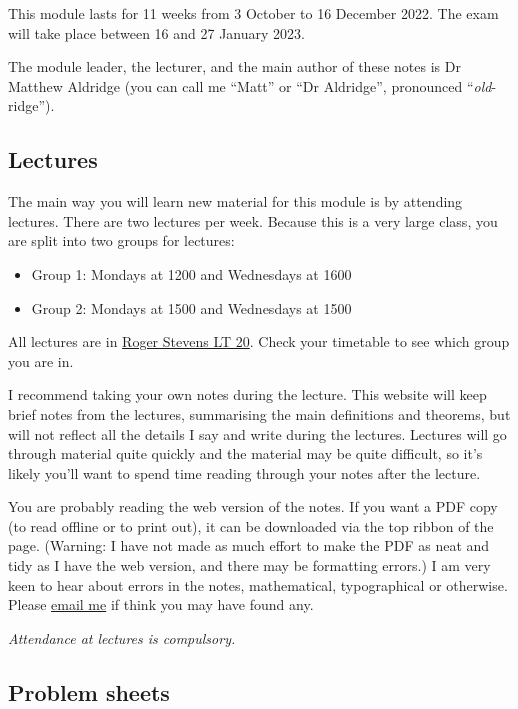 \documentclass[
  letterpaper,
]{report}
\providecommand{\tightlist}{%
  \setlength{\itemsep}{0pt}\setlength{\parskip}{0pt}}\usepackage{longtable,booktabs,array}
\theoremstyle{definition}
\theoremstyle{definition}
\theoremstyle{remark}
\begin{document}
This module lasts for 11 weeks from 3 October to 16 December 2022. The
exam will take place between 16 and 27 January 2023.

The module leader, the lecturer, and the main author of these notes is
Dr Matthew Aldridge (you can call me ``Matt'' or ``Dr Aldridge'',
pronounced ``\emph{old}-ridge'').

\hypertarget{lectures}{%
\subsection*{Lectures}\label{lectures}}

The main way you will learn new material for this module is by attending
lectures. There are two lectures per week. Because this is a very large
class, you are split into two groups for lectures:

\begin{itemize}
\tightlist
\item
  Group 1: Mondays at 1200 and Wednesdays at 1600
\item
  Group 2: Mondays at 1500 and Wednesdays at 1500
\end{itemize}

All lectures are in
\href{https://students.leeds.ac.uk/rooms?type=room\&id=100044}{Roger
Stevens LT 20}. Check your timetable to see which group you are in.

I recommend taking your own notes during the lecture. This website will
keep brief notes from the lectures, summarising the main definitions and
theorems, but will not reflect all the details I say and write during
the lectures. Lectures will go through material quite quickly and the
material may be quite difficult, so it's likely you'll want to spend
time reading through your notes after the lecture.

You are probably reading the web version of the notes. If you want a PDF
copy (to read offline or to print out), it can be downloaded via the top
ribbon of the page. (Warning: I have not made as much effort to make the
PDF as neat and tidy as I have the web version, and there may be
formatting errors.) I am very keen to hear about errors in the notes,
mathematical, typographical or otherwise. Please
\href{mailto:m.aldridge@leeds.ac.uk}{email me} if think you may have
found any.

\emph{Attendance at lectures is compulsory.}

\hypertarget{problem-sheets}{%
\subsection*{Problem sheets}\label{problem-sheets}}
\end{document}
